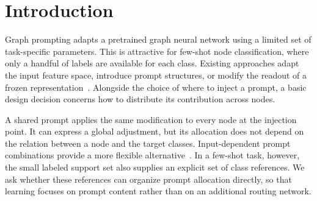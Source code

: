 \begin{abstract}
We introduce \method, a graph prompting method that uses support-set prototypes to route trainable prompts to individual nodes. With only a few labeled nodes per class, adaptation must determine both what a prompt should encode and where its contribution should be applied. \method{} constructs class references from aggregated node attributes, refines them using unlabeled graph features while retaining support anchors, and converts node--prototype associations into a fixed routing matrix. The resulting combinations of class prompt tokens are injected into a frozen graph convolutional encoder, followed by prototype classification. We evaluate each 1-, 3-, and 5-shot setting separately on Cora, CiteSeer, and PubMed using matched support draws and training seeds. In the 5-shot setting, \method{} achieves accuracies of 73.02\%, 66.17\%, and 70.98\%, respectively; replacing a shared prompt with prototype routing improves accuracy by 36.94, 40.45, and 3.02 percentage points in the corresponding conditions. These paired results support the value of prototype-guided prompt allocation within the evaluated transductive setting.
\end{abstract}

\section{Introduction}
Graph prompting adapts a pretrained graph neural network using a limited set of task-specific parameters. This is attractive for few-shot node classification, where only a handful of labels are available for each class. Existing approaches adapt the input feature space, introduce prompt structures, or modify the readout of a frozen representation~\citep{gpf2023,allinone2023,graphprompt2023}. Alongside the choice of where to inject a prompt, a basic design decision concerns how to distribute its contribution across nodes.

A shared prompt applies the same modification to every node at the injection point. It can express a global adjustment, but its allocation does not depend on the relation between a node and the target classes. Input-dependent prompt combinations provide a more flexible alternative~\citep{gpf2023}. In a few-shot task, however, the small labeled support set also supplies an explicit set of class references. We ask whether these references can organize prompt allocation directly, so that learning focuses on prompt content rather than on an additional routing network.

